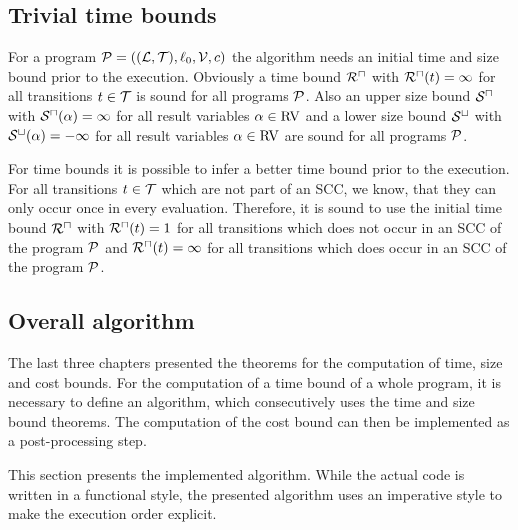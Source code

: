 \subsection{Trivial time bounds}

For a program $\mathcal{P} = ((\mathcal{L}, \mathcal{T}), \ell_0, \mathcal{V}, c)$ the algorithm needs an initial time and size bound prior to the execution.
Obviously a time bound ${\mathcal{R}^\sqcap}$ with ${\mathcal{R}^\sqcap}(t) = \infty$ for all transitions $t \in \mathcal{T}$ is sound for all programs $\mathcal{P}$.
Also an upper size bound ${\mathcal{S}^\sqcap}$ with ${\mathcal{S}^\sqcap}(\alpha) = \infty$ for all result variables $\alpha \in \text{RV}$ and a lower size bound ${\mathcal{S}^\sqcup}$ with ${\mathcal{S}^\sqcup}(\alpha) = -\infty$ for all result variables $\alpha \in \text{RV}$ are sound for all programs $\mathcal{P}$.

For time bounds it is possible to infer a better time bound prior to the execution.
For all transitions $t \in \mathcal{T}$ which are not part of an SCC, we know, that they can only occur once in every evaluation.
Therefore, it is sound to use the initial time bound ${\mathcal{R}^\sqcap}$ with ${\mathcal{R}^\sqcap}(t) = 1$ for all transitions which does not occur in an SCC of the program $\mathcal{P}$ and ${\mathcal{R}^\sqcap}(t) = \infty$ for all transitions which does occur in an SCC of the program $\mathcal{P}$.

\subsection{Overall algorithm}

The last three chapters presented the theorems for the computation of time, size and cost bounds.
For the computation of a time bound of a whole program, it is necessary to define an algorithm, which consecutively uses the time and size bound theorems.
The computation of the cost bound can then be implemented as a post-processing step.

This section presents the implemented algorithm.
While the actual code is written in a functional style, the presented algorithm uses an imperative style to make the execution order explicit.

